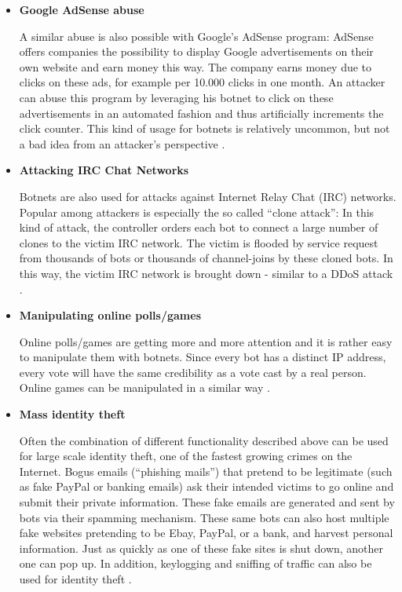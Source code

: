 \documentclass[]{article}
\begin{document}
\begin{itemize}
\item \textbf{Google AdSense abuse}

A similar abuse is also possible with Google’s AdSense \cite{website:adsense} program: AdSense offers companies the possibility to display Google advertisements on their own website and earn money this way. The company earns money due to clicks on these ads, for example per 10.000 clicks in one month. An attacker can abuse this program by leveraging his botnet to click on these advertisements in an automated fashion and thus artificially increments the click counter. This kind of usage for botnets is relatively uncommon, but not a bad idea from an attacker’s perspective \cite{article:honeypot-tracking} .


\item \textbf{Attacking IRC Chat Networks}

Botnets are also used for attacks against Internet Relay Chat (IRC) networks. Popular among attackers is especially the so called “clone attack”: In this kind of attack, the controller orders each bot to connect a large number of clones to the victim IRC network. The victim is flooded by service request from thousands of bots or thousands of channel-joins by these cloned bots. In this way, the victim IRC network is brought down - similar to a DDoS attack \cite{article:honeypot-tracking}.

\item \textbf{Manipulating online polls/games}

Online polls/games are getting more and more attention and it is rather easy to manipulate them with botnets. Since every bot has a distinct IP address, every vote will have the same credibility as a vote cast by a real person. Online games can be manipulated in a similar way \cite{article:honeypot-tracking}.

\item \textbf{Mass identity theft}

Often the combination of different functionality described above can be used for large scale identity theft, one of the fastest growing crimes on the Internet. Bogus emails (“phishing mails”) that pretend to be legitimate (such as fake PayPal or banking emails) ask their intended victims to go online and submit their private information. These fake emails are generated and sent by bots via their spamming mechanism. These same bots can also host multiple fake websites pretending to be Ebay, PayPal, or a bank, and harvest personal information. Just as quickly as one of these fake sites is shut down, another one can pop up. In addition, keylogging and sniffing of traffic can also be used for identity theft \cite{article:honeypot-tracking}.


\end{itemize}
\end{document}
